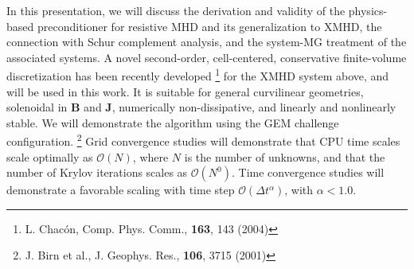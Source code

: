 \documentclass{report}
\begin{document}
In this presentation, we will discuss the derivation and validity
of the physics-based preconditioner for resistive MHD and its generalization
to XMHD, the connection with Schur complement analysis, and the system-MG
treatment of the associated systems. A novel second-order, cell-centered,
conservative finite-volume discretization has been recently developed%
\footnote{L. Chac\'{o}n, Comp. Phys. Comm., \textbf{163}, 143 (2004)
} for the XMHD system above, and will be used in this work. It is suitable
for general curvilinear geometries, solenoidal in $\mathbf{B}$ and
$\mathbf{J}$, numerically non-dissipative, and linearly and nonlinearly
stable. We will demonstrate the algorithm using the GEM challenge
configuration.%
\footnote{J. Birn et al., J. Geophys. Res., \textbf{106}, 3715 (2001)%
} Grid convergence studies will demonstrate that CPU time scales scale
optimally as $\mathcal{O}(N)$, where $N$ is the number of unknowns,
and that the number of Krylov iterations scales as $\mathcal{O}(N^{0})$.
Time convergence studies will demonstrate a favorable scaling with
time step $\mathcal{O}(\Delta t^{\alpha })$, with $\alpha <1.0$.
\end{document}
